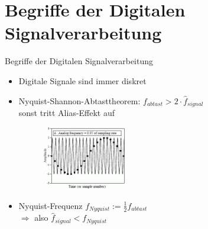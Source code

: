 \section{Begriffe der Digitalen Signalverarbeitung}
\begin{frame}{Begriffe der Digitalen Signalverarbeitung}
	\begin{itemize}
		\vspace{0.75em}
		\item Digitale Signale sind immer diskret \vspace{0.5em}
		\item Nyquist-Shannon-Abtasttheorem: $f_{abtast} > 2 \cdot \hat{f}_{signal}$ 
		\\ sonst tritt Alias-Effekt auf \vspace{0.5em}
		\begin{figure}
			\raggedright
			\includegraphics[width=0.35\textwidth]{images/alias-effekt2.png}
		\end{figure}
		\item Nyquist-Frequenz $f_{Nyquist} := \frac{1}{2} f_{abtast}$
		\\ $\Rightarrow$ also $\hat{f}_{signal} < f_{Nyquist}$  \vspace{0.5em}
	\end{itemize}
\end{frame}

 
